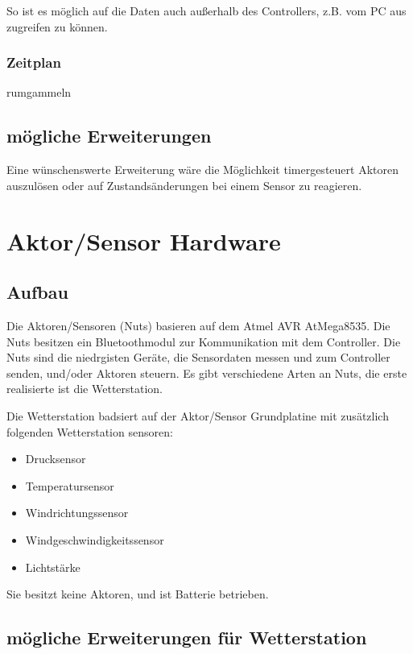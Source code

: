 \documentclass[12pt,a4paper]{article}
\begin{document}
So ist es möglich auf die Daten auch außerhalb des Controllers, z.B. vom PC aus zugreifen zu können.

\subsubsection{Zeitplan}

rumgammeln

\subsection{mögliche Erweiterungen}
Eine wünschenswerte Erweiterung wäre die Möglichkeit timergesteuert Aktoren auszulösen oder auf Zustandsänderungen bei einem Sensor zu reagieren.

\section{Aktor/Sensor Hardware}

\subsection{Aufbau}

Die Aktoren/Sensoren (Nuts) basieren auf dem Atmel AVR AtMega8535. Die Nuts besitzen ein Bluetoothmodul zur Kommunikation mit dem Controller. Die Nuts sind die niedrgisten Geräte, die Sensordaten messen und zum Controller senden, und/oder Aktoren steuern.
Es gibt verschiedene Arten an Nuts, die erste realisierte ist die Wetterstation.


Die Wetterstation badsiert auf der Aktor/Sensor Grundplatine mit zusätzlich folgenden Wetterstation sensoren:

\begin{itemize}
	\item Drucksensor
	\item Temperatursensor
	\item Windrichtungssensor
	\item Windgeschwindigkeitssensor
	\item Lichtstärke
\end{itemize}

Sie besitzt keine Aktoren, und ist Batterie betrieben.

\subsection{mögliche Erweiterungen für Wetterstation}
\end{document}
